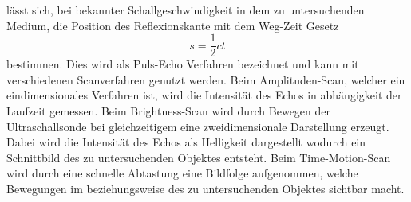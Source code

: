 lässt sich, bei bekannter Schallgeschwindigkeit in dem zu untersuchenden Medium, die Position des Reflexionskante mit dem Weg-Zeit Gesetz
\begin{equation}
  s=\frac{1}{2}ct
  \label{eqn:wegzeit}
\end{equation}
bestimmen. Dies wird als Puls-Echo Verfahren bezeichnet und kann mit verschiedenen Scanverfahren genutzt werden. Beim Amplituden-Scan, welcher ein eindimensionales Verfahren ist, wird die
Intensität des Echos in abhängigkeit der Laufzeit gemessen. Beim Brightness-Scan wird durch Bewegen der Ultraschallsonde bei gleichzeitigem eine zweidimensionale Darstellung erzeugt.
Dabei wird die Intensität des Echos als Helligkeit dargestellt wodurch ein Schnittbild des zu untersuchenden Objektes entsteht. Beim Time-Motion-Scan wird durch eine schnelle Abtastung
eine Bildfolge aufgenommen, welche Bewegungen im beziehungsweise des zu untersuchenden Objektes sichtbar macht.
\cite{sample}
